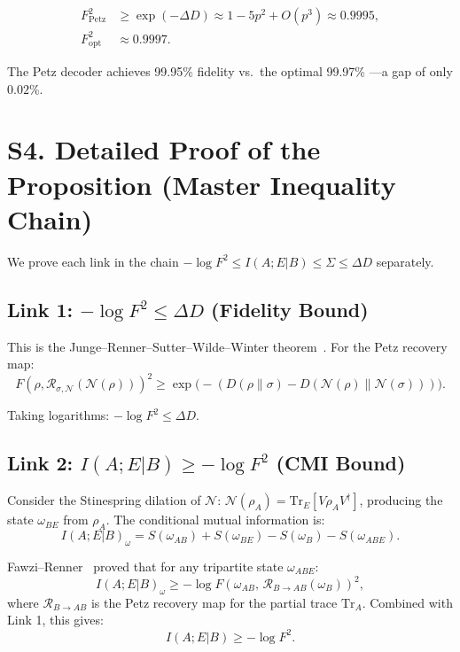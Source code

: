\documentclass[prl,twocolumn,superscriptaddress,longbibliography]{revtex4-2}
\newcommand{\Tr}{\mathrm{Tr}}
\newcommand{\Petz}{\mathcal{R}}
\newcommand{\chan}{\mathcal{N}}
\begin{document}
\begin{align}
F_{\mathrm{Petz}}^2 &\geq \exp(-\Delta D) \approx 1 - 5p^2 + O(p^3)
\approx 0.9995, \\
F_{\mathrm{opt}}^2 &\approx 0.9997.
\end{align}

The Petz decoder achieves 99.95\% fidelity vs.\ the optimal 99.97\%
---a gap of only $0.02\%$.

\section{S4. Detailed Proof of the Proposition (Master Inequality Chain)}
\label{sec:proof_theorem3}

We prove each link in the chain
$-\log F^2 \leq I(A;E|B) \leq \Sigma \leq \Delta D$ separately.

\subsection{Link 1: $-\log F^2 \leq \Delta D$ (Fidelity Bound)}

This is the Junge--Renner--Sutter--Wilde--Winter
theorem~\cite{Junge2018}. For the Petz recovery map:
\begin{equation}
F(\rho, \Petz_{\sigma,\chan}(\chan(\rho)))^2
\geq \exp\!\big(-(D(\rho\|\sigma) - D(\chan(\rho)\|\chan(\sigma)))\big).
\end{equation}

Taking logarithms: $-\log F^2 \leq \Delta D$.

\subsection{Link 2: $I(A;E|B) \geq -\log F^2$ (CMI Bound)}

Consider the Stinespring dilation of $\chan$:
$\chan(\rho_A) = \Tr_E[V \rho_A V^\dagger]$, producing the state
$\omega_{BE}$ from $\rho_A$. The conditional mutual information is:
\begin{equation}
I(A;E|B)_\omega = S(\omega_{AB}) + S(\omega_{BE}) - S(\omega_B) -
S(\omega_{ABE}).
\end{equation}

Fawzi--Renner~\cite{Fawzi2015} proved that for any tripartite state
$\omega_{ABE}$:
\begin{equation}
I(A;E|B)_\omega \geq -\log F(\omega_{AB},\,
\Petz_{B \to AB}(\omega_B))^2,
\end{equation}
where $\Petz_{B \to AB}$ is the Petz recovery map for the partial trace
$\Tr_A$. Combined with Link 1, this gives:
\begin{equation}
I(A;E|B) \geq -\log F^2.
\end{equation}
\end{document}

